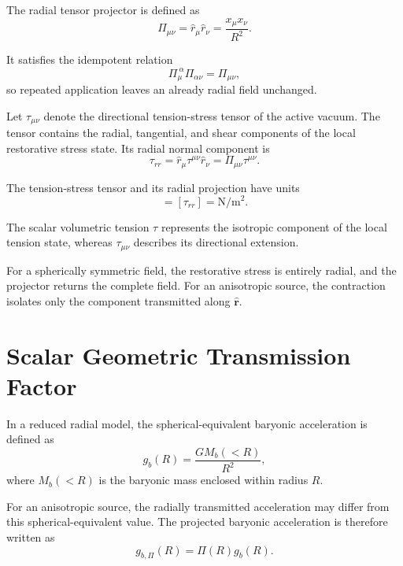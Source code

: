 The radial tensor projector is defined as
\begin{equation}
    \Pi_{\mu\nu} = \hat{r}_{\mu}\hat{r}_{\nu} = \frac{x_{\mu}x_{\nu}}{R^2}.
\end{equation}

It satisfies the idempotent relation
\begin{equation}
    \Pi_{\mu}^{\ \alpha} \Pi_{\alpha\nu} = \Pi_{\mu\nu},
\end{equation}
so repeated application leaves an already radial field unchanged.

Let $\tau_{\mu\nu}$ denote the directional tension-stress tensor of the active vacuum. The tensor contains the radial, tangential, and shear components of the local restorative stress state. Its radial normal component is
\begin{equation}
    \tau_{rr} = \hat{r}_{\mu}\tau^{\mu\nu}\hat{r}_{\nu} = \Pi_{\mu\nu}\tau^{\mu\nu}.
\end{equation}

The tension-stress tensor and its radial projection have units
\begin{equation}
    [\tau_{\mu\nu}] = [\tau_{rr}] = \mathrm{N/m^2}.
\end{equation}

The scalar volumetric tension $\tau$ represents the isotropic component of the local tension state, whereas $\tau_{\mu\nu}$ describes its directional extension.

For a spherically symmetric field, the restorative stress is entirely radial, and the projector returns the complete field. For an anisotropic source, the contraction isolates only the component transmitted along $\hat{\mathbf{r}}$.

\section{Scalar Geometric Transmission Factor}

In a reduced radial model, the spherical-equivalent baryonic acceleration is defined as
\begin{equation}
    g_b(R) = \frac{G M_b(<R)}{R^2},
\end{equation}
where $M_b(<R)$ is the baryonic mass enclosed within radius $R$.

For an anisotropic source, the radially transmitted acceleration may differ from this spherical-equivalent value. The projected baryonic acceleration is therefore written as
\begin{equation}
    g_{b,\Pi}(R) = \Pi(R) g_b(R).
\end{equation}

